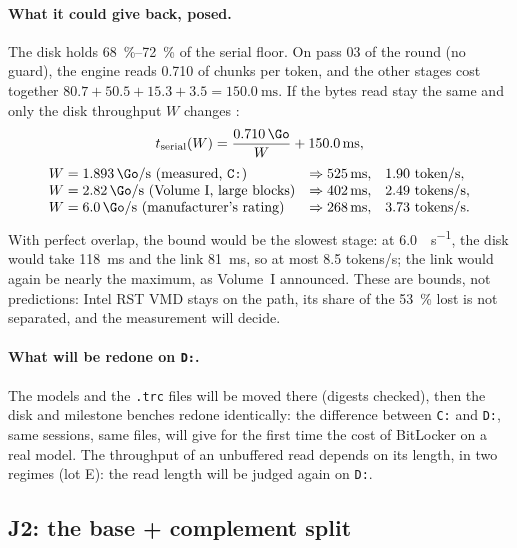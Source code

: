 \paragraph{What it could give back, posed.} The disk holds \SIrange{68}{72}{\percent} of the serial floor. On pass 03 of the round (no guard), the engine reads \SI{0.710}{\Go} of chunks per token, and the other stages cost together $80.7 + 50.5 + 15.3 + 3.5 = \SI{150.0}{\milli\second}$. If the bytes read stay the same and only the disk throughput $W$ changes \calc:
\[
t_{\text{serial}}(W) = \frac{\SI{0.710}{\Go}}{W} + \SI{150.0}{\milli\second},
\]
\[
\begin{array}{@{}lll@{}}
W = \SI{1.893}{\Go\per\second} \text{ (measured, \texttt{C:})} & \Rightarrow \SI{525}{\milli\second}, & \num{1.90} \text{ token/s},\\
W = \SI{2.82}{\Go\per\second} \text{ (Volume~I, large blocks)} & \Rightarrow \SI{402}{\milli\second}, & \num{2.49} \text{ tokens/s},\\
W = \SI{6.0}{\Go\per\second} \text{ (manufacturer's rating)} & \Rightarrow \SI{268}{\milli\second}, & \num{3.73} \text{ tokens/s}.
\end{array}
\]
With perfect overlap, the bound would be the slowest stage: at \SI{6.0}{\Go\per\second}, the disk would take \SI{118}{\milli\second} and the link \SI{81}{\milli\second}, so at most \num{8.5} tokens/s; the link would again be nearly the maximum, as Volume~I announced. These are bounds, not predictions: Intel RST VMD stays on the path, its share of the \SI{53}{\percent} lost is not separated, and the measurement will decide.

\paragraph{What will be redone on \texttt{D:}.} The models and the \texttt{.trc} files will be moved there (digests checked), then the disk and milestone benches redone identically: the difference between \texttt{C:} and \texttt{D:}, same sessions, same files, will give for the first time the cost of BitLocker on a real model. The throughput of an unbuffered read depends on its length, in two regimes (lot E): the read length will be judged again on \texttt{D:}.

\subsection{J2: the base + complement split}\label{t2d-sec:j2}

